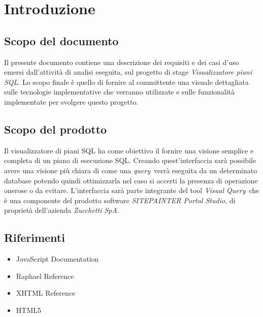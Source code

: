 
% 
\section{Introduzione}
\subsection{Scopo del documento}
Il presente documento contiene una descrizione dei requisiti e dei casi d'uso emersi dall'attività
di analisi eseguita, sul progetto di stage \textit{Visualizzatore piani SQL}.
Lo scopo finale è quello di fornire al committente una visuale dettagliata sulle tecnologie implementative che verranno utilizzate e sulle funzionalità implementate per svolgere questo progetto.
\subsection{Scopo del prodotto}
Il visualizzatore di piani SQL ha come obiettivo il fornire una visione semplice e completa di un piano di esecuzione SQL. Creando quest'interfaccia sarà possibile avere una visione più chiara di come una \textit{query}\ verrà eseguita da un determinato database potendo quindi ottimizzarla nel caso si accerti la presenza di operazione onerose o da evitare. L'interfaccia sarà parte integrante del tool \textit{Visual Query}\ che è una componente del prodotto software \textit{SITEPAINTER Portal Studio}, di proprietà dell'azienda \textit{Zucchetti SpA}.
\subsection{Riferimenti}
\begin{itemize}
\item JavaScript Documentation
\item Raphael Reference
\item XHTML Reference
\item HTML5
\end{itemize}
\newpage
